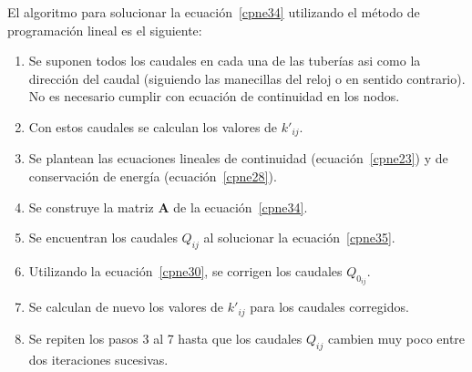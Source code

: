 \documentclass[11pt, oneside]{article}
\begin{document}
El algoritmo para solucionar la ecuaci\'on~\ref{cpne34} utilizando el m\'etodo de programaci\'on lineal es el siguiente:

\begin{enumerate}
\item Se suponen todos los caudales en cada una de las tuber\'ias asi como la direcci\'on del caudal (siguiendo las manecillas del reloj o en sentido contrario). No es necesario cumplir con ecuaci\'on de continuidad en los nodos.
\item Con estos caudales se calculan los valores de $k'_{ij}$.
\item Se plantean las ecuaciones lineales de continuidad (ecuaci\'on~\ref{cpne23}) y de conservaci\'on de energ\'ia (ecuaci\'on~\ref{cpne28}).
\item Se construye la matriz $\mathbf{A}$ de la ecuaci\'on~\ref{cpne34}.
\item Se encuentran los caudales $Q_{ij}$ al solucionar la ecuaci\'on~\ref{cpne35}.
\item Utilizando la ecuaci\'on~\ref{cpne30}, se corrigen los caudales $Q_{0_{ij}}$.
\item Se calculan de nuevo los valores de $k'_{ij}$ para los caudales corregidos.
\item Se repiten los pasos 3 al 7 hasta que los caudales $Q_{ij}$ cambien muy poco entre dos iteraciones sucesivas. 
\end{enumerate}





\end{document}
